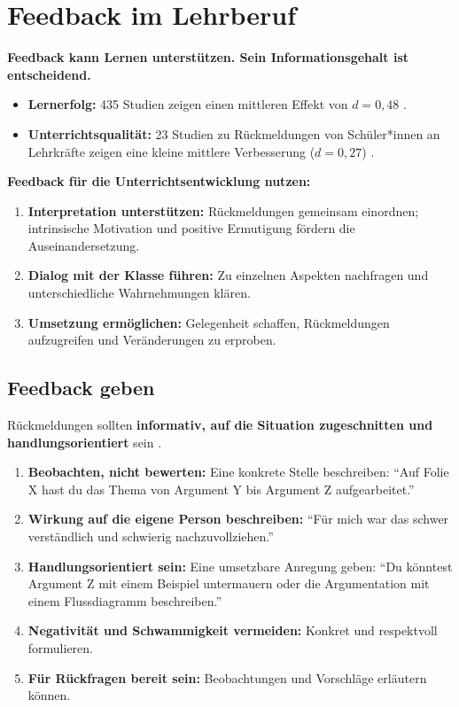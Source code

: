 \documentclass[11pt,a4paper,parskip=half]{scrartcl}
\begin{document}
\section{Feedback im Lehrberuf}
\textbf{Feedback kann Lernen unterstützen. Sein Informationsgehalt ist entscheidend.}
\begin{itemize}
  \item \textbf{Lernerfolg:} 435 Studien zeigen einen mittleren Effekt von
        $d=0{,}48$ \parencite{10.3389/fpsyg.2019.03087}.
  \item \textbf{Unterrichtsqualität:} 23 Studien zu Rückmeldungen von
        Schüler*innen an Lehrkräfte zeigen eine kleine mittlere Verbesserung
        ($d=0{,}27$) \parencite{roehl2025}.
\end{itemize}
\textbf{Feedback für die Unterrichtsentwicklung nutzen:}
\begin{enumerate}
  \item \textbf{Interpretation unterstützen:} Rückmeldungen gemeinsam einordnen;
        intrinsische Motivation und positive Ermutigung fördern die Auseinandersetzung.
  \item \textbf{Dialog mit der Klasse führen:} Zu einzelnen Aspekten nachfragen
        und unterschiedliche Wahrnehmungen klären.
  \item \textbf{Umsetzung ermöglichen:} Gelegenheit schaffen, Rückmeldungen
        aufzugreifen und Veränderungen zu erproben.
\end{enumerate}

\subsection*{Feedback geben}
Rückmeldungen sollten \textbf{informativ, auf die Situation zugeschnitten und
handlungsorientiert} sein \parencite{brandmo2025}.
\begin{enumerate}
  \item \textbf{Beobachten, nicht bewerten:} Eine konkrete Stelle beschreiben:
        \enquote{Auf Folie X hast du das Thema von Argument Y bis Argument Z aufgearbeitet.}
  \item \textbf{Wirkung auf die eigene Person beschreiben:}
        \enquote{Für mich war das schwer verständlich und schwierig nachzuvollziehen.}
  \item \textbf{Handlungsorientiert sein:} Eine umsetzbare Anregung geben:
        \enquote{Du könntest Argument Z mit einem Beispiel untermauern oder
        die Argumentation mit einem Flussdiagramm beschreiben.}
  \item \textbf{Negativität und Schwammigkeit vermeiden:} Konkret und respektvoll formulieren.
  \item \textbf{Für Rückfragen bereit sein:} Beobachtungen und Vorschläge erläutern können.
\end{enumerate}
\end{document}
